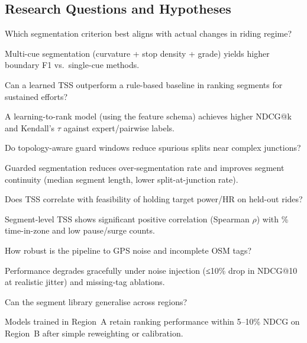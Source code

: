 \documentclass[11pt,twoside]{report}
\begin{document}
\subsection{Research Questions and Hypotheses}
\begin{description}[leftmargin=2.2em, style=nextline]
	\item[RQ1:] Which segmentation criterion best aligns with actual changes in riding regime?
	\item[H1:] Multi-cue segmentation (curvature + stop density + grade) yields higher boundary F1 vs.\ single-cue methods.

	\item[RQ2:] Can a learned TSS outperform a rule-based baseline in ranking segments for sustained efforts?
	\item[H2:] A learning-to-rank model (using the feature schema) achieves higher NDCG@k and Kendall’s $\tau$ against expert/pairwise labels.

	\item[RQ3:] Do topology-aware guard windows reduce spurious splits near complex junctions?
	\item[H3:] Guarded segmentation reduces over-segmentation rate and improves segment continuity (median segment length, lower split-at-junction rate).

	\item[RQ4:] Does TSS correlate with feasibility of holding target power/HR on held-out rides?
	\item[H4:] Segment-level TSS shows significant positive correlation (Spearman $\rho$) with \% time-in-zone and low pause/surge counts.

	\item[RQ5:] How robust is the pipeline to GPS noise and incomplete OSM tags?
	\item[H5:] Performance degrades gracefully under noise injection (≤10\% drop in NDCG@10 at realistic jitter) and missing-tag ablations.

	\item[RQ6:] Can the segment library generalise across regions?
	\item[H6:] Models trained in Region~A retain ranking performance within 5–10\% NDCG on Region~B after simple reweighting or calibration.
\end{description}
\end{document}
